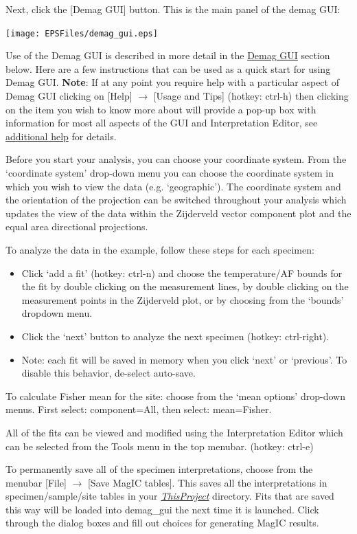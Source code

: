 \documentclass[11pt]{book}
\begin{document}
{{Next, click the [Demag GUI] button.  This is the main panel of the demag GUI:

\texttt{[image: EPSFiles/demag\_gui.eps]}

Use of the Demag GUI is described in more detail in the \href{#demag_gui.py}{Demag GUI} section below. Here are a few instructions that can be used as a quick start for using Demag GUI. {\bf Note}: If at any point you require help with a particular aspect of Demag GUI clicking on [Help] $\rightarrow$ [Usage and Tips] (hotkey: ctrl-h) then clicking on the item you wish to know more about will provide a pop-up box with information for most all aspects of the GUI and Interpretation Editor, see \hyperref[add-help]{additional help} for details.

Before you start your analysis, you can choose your coordinate system.  From the `coordinate system' drop-down menu you can choose the coordinate system in which you wish to view the data (e.g.  `geographic'). The coordinate system and the orientation of the projection can be switched throughout your analysis which updates the view of the data within the Zijderveld vector component plot and the equal area directional projections.

To analyze the data in the example, follow these steps for each specimen:
\begin{itemize}
\item Click `add a fit' (hotkey: ctrl-n) and choose the temperature/AF bounds for the fit by double clicking on the measurement lines, by double clicking on the measurement points in the Zijderveld plot, or by choosing from the `bounds' dropdown menu.
\item Click the `next' button to analyze the next specimen (hotkey: ctrl-right).
\item Note: each fit will be saved in memory when you click `next' or `previous'.  To disable this behavior, de-select auto-save.
\end{itemize}

To calculate  Fisher mean for the site: choose from the `mean options' drop-down menus.  First select: component=All, then select: mean=Fisher.

All of the fits can be viewed and modified using the Interpretation Editor which can be selected from the Tools menu in the top menubar. (hotkey: ctrl-e)

To permanently save all of the specimen interpretations, choose from the menubar [File] $\rightarrow$ [Save MagIC  tables]. This saves all the interpretations in specimen/sample/site tables in your \href{#Project_Directory}{\it ThisProject} directory. Fits that are saved this way will be loaded into demag\_gui the next time it is launched.  Click through the dialog boxes and fill out choices for generating MagIC results.

}}
\end{document}
